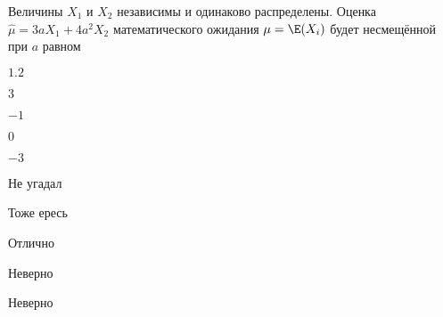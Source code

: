 
\begin{question}
Величины \(X_1\) и \(X_2\) независимы и одинаково распределены. Оценка
\(\hat\mu = 3aX_1 + 4a^2X_2\) математического ожидания \(\mu = \E(X_i)\)
будет несмещённой при \(a\) равном
\begin{answerlist}
  \item \(1.2\)
  \item \(3\)
  \item \(-1\)
  \item \(0\)
  \item \(-3\)
\end{answerlist}
\end{question}

\begin{solution}
\begin{answerlist}
  \item Не угадал
  \item Тоже ересь
  \item Отлично
  \item Неверно
  \item Неверно
\end{answerlist}
\end{solution}

